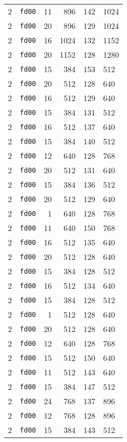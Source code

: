 \documentclass{article}
\begin{document}
\begin{table}[h!]
\begin{tabular}{llrrrl}
    2 & \texttt{fd00} & 11 & 896 & 142 & 1024 \\
    2 & \texttt{fd00} & 20 & 896 & 129 & 1024 \\
    2 & \texttt{fd00} & 16 & 1024 & 132 & 1152 \\
    2 & \texttt{fd00} & 20 & 1152 & 128 & 1280 \\
    2 & \texttt{fd00} & 15 & 384 & 153 & 512 \\
    2 & \texttt{fd00} & 20 & 512 & 128 & 640 \\
    2 & \texttt{fd00} & 16 & 512 & 129 & 640 \\
    2 & \texttt{fd00} & 15 & 384 & 131 & 512 \\
    2 & \texttt{fd00} & 16 & 512 & 137 & 640 \\
    2 & \texttt{fd00} & 15 & 384 & 140 & 512 \\
    2 & \texttt{fd00} & 12 & 640 & 128 & 768 \\
    2 & \texttt{fd00} & 20 & 512 & 131 & 640 \\
    2 & \texttt{fd00} & 15 & 384 & 136 & 512 \\
    2 & \texttt{fd00} & 20 & 512 & 129 & 640 \\
    2 & \texttt{fd00} & 1 & 640 & 128 & 768 \\
    2 & \texttt{fd00} & 11 & 640 & 150 & 768 \\
    2 & \texttt{fd00} & 16 & 512 & 135 & 640 \\
    2 & \texttt{fd00} & 20 & 512 & 128 & 640 \\
    2 & \texttt{fd00} & 15 & 384 & 128 & 512 \\
    2 & \texttt{fd00} & 16 & 512 & 134 & 640 \\
    2 & \texttt{fd00} & 15 & 384 & 128 & 512 \\
    2 & \texttt{fd00} & 1 & 512 & 128 & 640 \\
    2 & \texttt{fd00} & 20 & 512 & 128 & 640 \\
    2 & \texttt{fd00} & 12 & 640 & 128 & 768 \\
    2 & \texttt{fd00} & 15 & 512 & 150 & 640 \\
    2 & \texttt{fd00} & 11 & 512 & 143 & 640 \\
    2 & \texttt{fd00} & 15 & 384 & 147 & 512 \\
    2 & \texttt{fd00} & 24 & 768 & 137 & 896 \\
    2 & \texttt{fd00} & 12 & 768 & 128 & 896 \\
    2 & \texttt{fd00} & 15 & 384 & 143 & 512 \\

\end{tabular}
\end{table}
\end{document}
